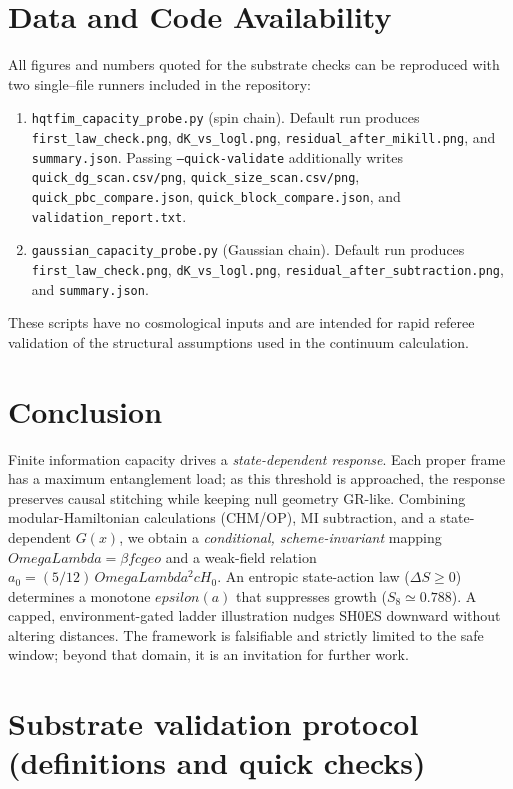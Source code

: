 \documentclass[aps,prd,onecolumn,superscriptaddress,nofootinbib]{revtex4-2}
\def\OmL{OmegaLambda}%
\def\cgeo{cgeo}%
\def\eps{epsilon}%
\newcommand{\OmL}{\Omega_\Lambda}
\newcommand{\cgeo}{c_{\rm geo}}
\newcommand{\eps}{\varepsilon}
\begin{document}
\section{Data and Code Availability}
\label{sec:data-code}
All figures and numbers quoted for the substrate checks can be reproduced with two single–file runners included in the repository:
\begin{enumerate}[leftmargin=1.3em]
\item \texttt{hqtfim\_capacity\_probe.py} (spin chain). Default run produces \texttt{first\_law\_check.png}, \texttt{dK\_vs\_logl.png}, \texttt{residual\_after\_mikill.png}, and \texttt{summary.json}. Passing \texttt{--quick-validate} additionally writes \texttt{quick\_dg\_scan.csv/png}, \texttt{quick\_size\_scan.csv/png}, \texttt{quick\_pbc\_compare.json}, \texttt{quick\_block\_compare.json}, and \texttt{validation\_report.txt}.
\item \texttt{gaussian\_capacity\_probe.py} (Gaussian chain). Default run produces \texttt{first\_law\_check.png}, \texttt{dK\_vs\_logl.png}, \texttt{residual\_after\_subtraction.png}, and \texttt{summary.json}.
\end{enumerate}
These scripts have no cosmological inputs and are intended for rapid referee validation of the structural assumptions used in the continuum calculation.

\section{Conclusion}
Finite information capacity drives a \emph{state-dependent response}. Each proper frame has a maximum entanglement load; as this threshold is approached, the response preserves causal stitching while keeping null geometry GR-like. Combining modular-Hamiltonian calculations (CHM/OP), MI subtraction, and a state-dependent $G(x)$, we obtain a \emph{conditional, scheme-invariant} mapping $\OmL=\beta f \cgeo$ and a weak-field relation $a_0=(5/12)\,\OmL^2 cH_0$. An entropic state-action law ($\Delta S\ge 0$) determines a monotone $\eps(a)$ that suppresses growth ($S_8\simeq 0.788$). A capped, environment-gated ladder illustration nudges SH0ES downward without altering distances. The framework is falsifiable and strictly limited to the safe window; beyond that domain, it is an invitation for further work.

\appendix

\section{Substrate validation protocol (definitions and quick checks)}
\label{app:substrate-protocol}
\end{document}

